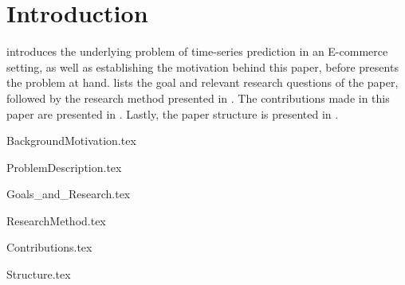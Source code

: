 \chapter{Introduction}
\label{cha:Introduction}

introduces the underlying problem of time-series prediction in an E-commerce setting,
as well as establishing the motivation behind this paper,
before 
presents the problem at hand.
 lists the goal and relevant research questions of the paper,
followed by the research method presented in .
The contributions made in this paper are presented in .
Lastly, the paper structure is presented in .



{BackgroundMotivation.tex}

{ProblemDescription.tex}

{Goals_and_Research.tex}

{ResearchMethod.tex}

{Contributions.tex}

{Structure.tex}
